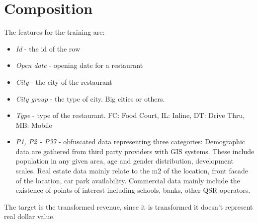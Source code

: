 \documentclass[a4paper,10pt]{report}
\begin{document}
\section{Composition}
The features for the training are:
\begin{itemize}
\item \emph{Id} - the id of the row
\item \emph{Open date} - opening date for a restaurant
\item \emph{City} - the city of the restaurant
\item \emph{City group} - the type of city. Big cities or others.
\item \emph{Type} - type of the restaurant. FC: Food Court, IL: Inline, DT: Drive Thru, MB: Mobile
\item \emph{P1, P2 - P37} - obfuscated data representing three categories:  Demographic data are gathered from third party providers with GIS systems. These include population in any given area, age and gender distribution, development scales. Real estate data mainly relate to the m2 of the location, front facade of the location, car park availability. Commercial data mainly include the existence of points of interest including schools, banks, other QSR operators.
\end{itemize}
The target is the transformed revenue, since it is transformed it doesn't represent real dollar value.
\end{document}
